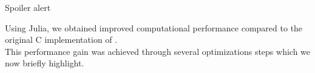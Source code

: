 \documentclass[
	11pt, %
 xcolor={dvipsnames,svgnames}
]{beamer}
\let\cite\citep
\begin{document}
\begin{frame}{Spoiler alert}




Using Julia, we obtained \alert{improved computational performance} compared to the original C implementation of \cite{1-drpm}.\\[6pt]
This performance gain was achieved through several optimizations steps which we now briefly highlight.
\end{frame}


\end{document}
